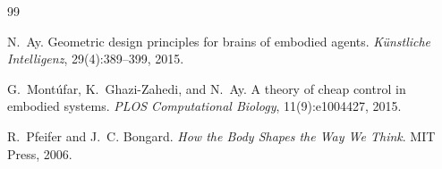 \documentclass[11pt]{article}
\begin{document}


\begin{thebibliography}{99}

N.~Ay.
\newblock Geometric design principles for brains of embodied agents.
\newblock \emph{K{\"u}nstliche Intelligenz}, 29(4):389--399, 2015.

G.~Mont\'{u}far, K.~Ghazi-Zahedi, and N.~Ay.
\newblock A theory of cheap control in embodied systems.
\newblock \emph{PLOS Computational Biology}, 11(9):e1004427, 2015.

R.~Pfeifer and J.~C. Bongard.
\newblock \emph{How the Body Shapes the Way We Think}.
\newblock MIT Press, 2006.

\end{thebibliography}
\end{document}
